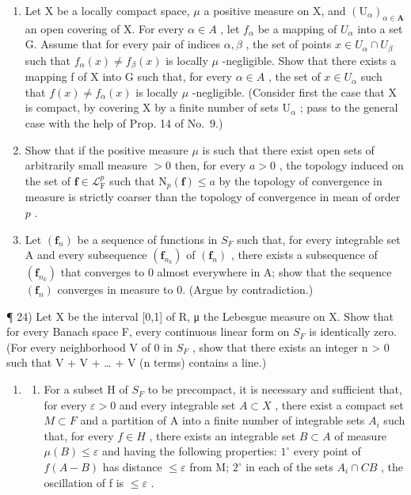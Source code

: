 \begin{enumerate}
\def\labelenumi{\arabic{enumi})}
\setcounter{enumi}{20}
\item
  Let X be a locally compact space, \(\mu\) a positive measure on X, and \((\mathrm{U}_{\alpha})_{\alpha\in\mathbf{A}}\) an open covering of X. For every \(\alpha\in A\) , let \(f_{\alpha}\) be a mapping of \(U_{\alpha}\) into a set G. Assume that for every pair of indices \(\alpha,\beta\) , the set of points \(x\in U_{\alpha}\cap U_{\beta}\) such that \(f_{\alpha}(x)\neq f_{\beta}(x)\) is locally \(\mu\) -negligible. Show that there exists a mapping f of X into G such that, for every \(\alpha\in A\) , the set of \(x\in U_{\alpha}\) such that \(f(x)\neq f_{\alpha}(x)\) is locally \(\mu\) -negligible. (Consider first the case that X is compact, by covering X by a finite number of sets \(\mathrm{U}_{\alpha}\) ; pass to the general case with the help of Prop. 14 of No.~9.)
\item
  Show that if the positive measure \(\mu\) is such that there exist open sets of arbitrarily small measure \(>0\) then, for every \(a > 0\) , the topology induced on the set of \(\mathbf{f} \in \mathcal{L}_{\mathrm{F}}^{p}\) such that \(\mathrm{N}_p(\mathbf{f}) \leqslant a\) by the topology of convergence in measure is strictly coarser than the topology of convergence in mean of order \(p\) .
\item
  Let \((\mathbf{f}_{n})\) be a sequence of functions in \(S_{F}\) such that, for every integrable set A and every subsequence \((\mathbf{f}_{n_{k}})\) of \((\mathbf{f}_{n})\) , there exists a subsequence of \((\mathbf{f}_{n_{k}})\) that converges to 0 almost everywhere in A; show that the sequence \((\mathbf{f}_{n})\) converges in measure to 0. (Argue by contradiction.)
\end{enumerate}

¶ 24) Let X be the interval {[}0,1{]} of R, μ the Lebesgue measure on X. Show that for every Banach space F, every continuous linear form on \(S_F\) is identically zero. (For every neighborhood V of 0 in \(S_F\) , show that there exists an integer n \textgreater{} 0 such that V + V + \ldots{} + V (n terms) contains a line.)

\begin{enumerate}
\def\labelenumi{\arabic{enumi})}
\setcounter{enumi}{24}
\tightlist
\item
  \begin{enumerate}
  \def\labelenumii{\alph{enumii})}
  \tightlist
  \item
    For a subset H of \(S_{F}\) to be precompact, it is necessary and sufficient that, for every \(\varepsilon > 0\) and every integrable set \(A \subset X\) , there exist a compact set \(M \subset F\) and a partition of A into a finite number of integrable sets \(A_{i}\) such that, for every \(f \in H\) , there exists an integrable set \(B \subset A\) of measure \(\mu(B) \leqslant \varepsilon\) and having the following properties: \(1^{\circ}\) every point of \(f(A - B)\) has distance \(\leqslant \varepsilon\) from M; \(2^{\circ}\) in each of the sets \(A_{i} \cap C B\) , the oscillation of f is \(\leqslant \varepsilon\) .
  \end{enumerate}
\end{enumerate}


